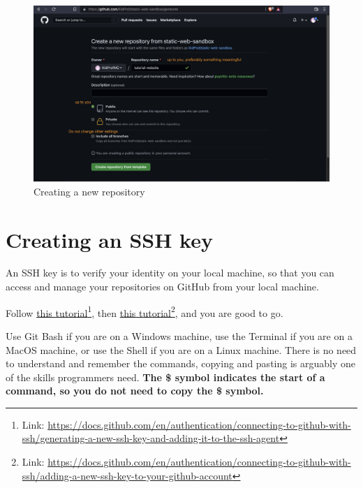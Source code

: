 \begin{figure}[h]
\centering
\includegraphics[width=15cm]{images/ch1-create-new-repo.png}
\caption{Creating a new repository}
\label{fig:createnewrepo}
\end{figure}

\section{Creating an SSH key}

An SSH key is to verify your identity on your local machine, so that you can access and manage your repositories on GitHub from your local machine.

Follow \href{https://docs.github.com/en/authentication/connecting-to-github-with-ssh/generating-a-new-ssh-key-and-adding-it-to-the-ssh-agent}{this tutorial}\footnote{Link: \url{https://docs.github.com/en/authentication/connecting-to-github-with-ssh/generating-a-new-ssh-key-and-adding-it-to-the-ssh-agent}}, then \href{https://docs.github.com/en/authentication/connecting-to-github-with-ssh/adding-a-new-ssh-key-to-your-github-account}{this tutorial}\footnote{Link: \url{https://docs.github.com/en/authentication/connecting-to-github-with-ssh/adding-a-new-ssh-key-to-your-github-account}}, and you are good to go. 
\vspace{6mm}

Use Git Bash if you are on a Windows machine, use the Terminal if you are on a MacOS machine, or use the Shell if you are on a Linux machine. There is no need to understand and remember the commands, copying and pasting is arguably one of the skills programmers need. \textbf{The \$ symbol indicates the start of a command, so you do not need to copy the \$ symbol.}
\vspace{6mm}

